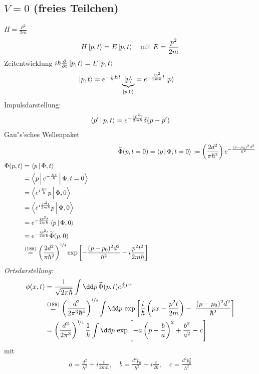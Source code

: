 \documentclass[a4paper]{scrartcl}
\begin{document}
{\subsection{$V = 0$ (freies Teilchen)}
$H = \frac {P^2}{2m}$
\begin{align}
H \Ket {p, t} = E \Ket{ p, t} \quad  \mathrm{ mit \ } E = \frac{p^2}{2m}
\end{align}
Zeitentwicklung $i \hbar \frac \partial {\partial t} \Ket{ p, t} = E \Ket{ p, t}$
\begin{align}
\ket{ p,t} & = e^{- \frac i \hbar E t} \underbrace{ \Ket p }_{\Ket{ p, 0}} = e^{- \frac {i p^2}{2 m \hbar} t} \Ket p
\end{align}
Impulsdarstellung:
\begin{align}
\Braket{ p' | p, t} = e^{- \frac{i p^2 t}{2 m \hbar}} \delta (p - p')
\end{align}
Gau"s'sches Wellenpaket
\begin{align}
\widetilde \Phi (p, t=0) & = \Braket { p | \Phi, t=0} := \left( \frac{ 2d^2}{\pi \hbar^2 } \right) e^{- \frac{(p - p_0)^2 d^2} {\hbar^2}} \\
\begin{split}
\Phi(p, t) & = \Braket{ p | \Phi, t} \\
& = \Braket{ p | e^{- \frac{Ht}{\hbar}} | \Phi, t=0} \\
& = \Braket{ e^{i \frac {H t}{\hbar}} p| \Phi, 0} \\
& = \Braket{ e^{i \frac{P^2 t}{2m \hbar}} p | \Phi, 0} \\
& = e^{- \frac {i p^2 t}{2m \hbar}} \Braket{ p | \Phi, 0} \\
& = e^{- \frac{i p^2 t}{2m \hbar}} \widetilde \Phi(p, 0) \\
& \stackrel{(188)}= \left( \frac{2d^2}{\pi \hbar^2} \right) ^{\nicefrac 1 4} \exp \left[- \frac{ (p-p_0)^2 d^2}{\hbar^2} - i \frac{p^2 t^2}{2m \hbar}\right]
\end{split}
\end{align}
\emph{Ortsdarstellung}:
\begin{align}
\begin{split}
\phi(x,t) & = \frac 1{\sqrt{2 \pi \hbar}} \int \dd p \, \widetilde \Phi(p,t) e^{\frac i \hbar p x} \\
& \stackrel{(189)}= \left( \frac {d^2}{2 \pi^3 \hbar^4} \right)^{\nicefrac 1 4} \int \dd p \, \exp \left[ \frac i \hbar \left(p x - \frac{ p^2 t}{2m} \right) - \ \frac{ (p - p_0)^2 d^2}{\hbar^2} \right] \\
& = \left( \frac{d^2}{2 \pi^3} \right)^{\nicefrac 1 4} \frac 1 \hbar \int \dd p \, \exp \left[ - a \left( p - \frac b a \right)^2 + \frac{b^2}{a^2} - c \right]
\end{split}
\end{align}
mit 
\begin{align}
a = \frac{d^2}{\hbar^2} + i \frac t {2m \hbar}, \quad b = \frac{d^2 p_0}{\hbar^2} + i \frac{x}{2 \hbar}, \quad c = \frac{d^2 p_0^2}{\hbar^2}
\end{align}

}
\end{document}
